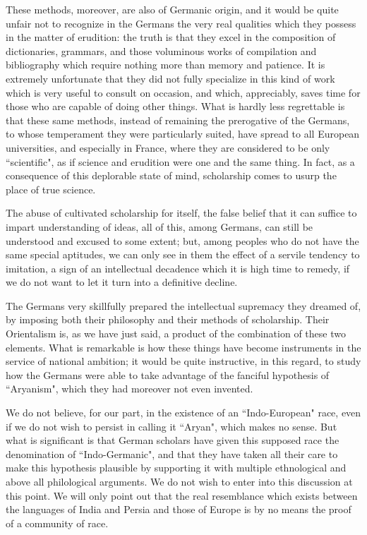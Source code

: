These methods, moreover, are also of Germanic origin, and it would be quite unfair not to recognize in the Germans the very real qualities which they possess in the matter of erudition: the truth is that they excel in the composition of dictionaries, grammars, and those voluminous works of compilation and bibliography which require nothing more than memory and patience. It is extremely unfortunate that they did not fully specialize in this kind of work which is very useful to consult on occasion, and which, appreciably, saves time for those who are capable of doing other things. What is hardly less regrettable is that these same methods, instead of remaining the prerogative of the Germans, to whose temperament they were particularly suited, have spread to all European universities, and especially in France, where they are considered to be only ``scientific", as if science and erudition were one and the same thing. In fact, as a consequence of this deplorable state of mind, scholarship comes to usurp the place of true science.

The abuse of cultivated scholarship for itself, the false belief that it can suffice to impart understanding of ideas, all of this, among Germans, can still be understood and excused to some extent; but, among peoples who do not have the same special aptitudes, we can only see in them the effect of a servile tendency to imitation, a sign of an intellectual decadence which it is high time to remedy, if we do not want to let it turn into a definitive decline.

The Germans very skillfully prepared the intellectual supremacy they dreamed of, by imposing both their philosophy and their methods of scholarship. Their Orientalism is, as we have just said, a product of the combination of these two elements. What is remarkable is how these things have become instruments in the service of national ambition; it would be quite instructive, in this regard, to study how the Germans were able to take advantage of the fanciful hypothesis of ``Aryanism", which they had moreover not even invented.

We do not believe, for our part, in the existence of an ``Indo-European" race, even if we do not wish to persist in calling it ``Aryan", which makes no sense. But what is significant is that German scholars have given this supposed race the denomination of ``Indo-Germanic", and that they have taken all their care to make this hypothesis plausible by supporting it with multiple ethnological and above all philological arguments. We do not wish to enter into this discussion at this point. We will only point out that the real resemblance which exists between the languages \hspace{0pt}\hspace{0pt}of India and Persia and those of Europe is by no means the proof of a community of race.

